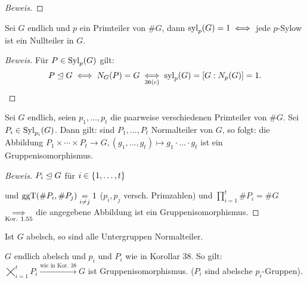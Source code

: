 \documentclass[a4paper]{report}
\begin{document}
\begin{satz}
\begin{proof}[Beweis]
\end{proof}
\end{satz}

\begin{kor}
  Sei $G$ endlich und $p$ ein Primteiler von $\#G$, dann $\operatorname{syl}_{p}(G) = 1 \iff$ jede $p$-Sylow ist ein Nullteiler in $G$.
  \begin{proof}[Beweis]
    Für $P \in \operatorname{Syl}_{p}(G)$ gilt:
    \[P \trianglelefteq G \iff N_{G}(P) = G \underset{36(c)}\iff \operatorname{syl}_{p}(G) = [G : N_{p}(G)] = 1.\qedhere\]
  \end{proof}
\end{kor}


\begin{kor}%
  Sei $G$ endlich, seien $p_{1}, ..., p_{t}$ die paarweise verschiedenen Primteiler von $\#G$. Sei $P_{i} \in \operatorname{Syl}_{p_{i}}(G)$. Dann gilt:
  sind $P_{1}, ..., P_{t}$ Normalteiler von $G$, so folgt: die Abbildung $P_{1} \times \cdots \times P_{t} \to G, (g_{1}, ..., g_{t}) \mapsto g_{1}\cdot ... \cdot g_{t}$ ist ein Gruppenisomorphismus.
\end{kor}
\begin{proof}[Beweis]
  $P_{i} \trianglelefteq G$ für $i \in \{1, \ldots, t\}$

  und $\operatorname{ggT}(\#P_{i}, \#P_{j}) \underset{i \ne j} = 1$ ($p_{i}, p_{j}$ versch. Primzahlen)
  und $\prod_{i=1}^{t}\#P_{i} = \#G$
$\underset{\text{Kor. 1.55}}{\implies} $ die angegebene Abbildung ist ein Gruppenisomorphismus.
\end{proof}

\begin{bsp*}
  Ist $G$ abelsch, so sind alle Untergruppen Normalteiler.
\end{bsp*}

\begin{kor} %
  $G$ endlich abelsch und $p_{i}$ und $P_{i}$ wie in Korollar 38. So gilt: $\bigtimes_{i=1}^{t}P_{i} \xrightarrow{\text{wie in Kor. 38}} G$ ist Gruppenisomorphismus. ($P_{i}$ sind abelsche $p_{i}$-Gruppen).
\end{kor}
\end{document}
